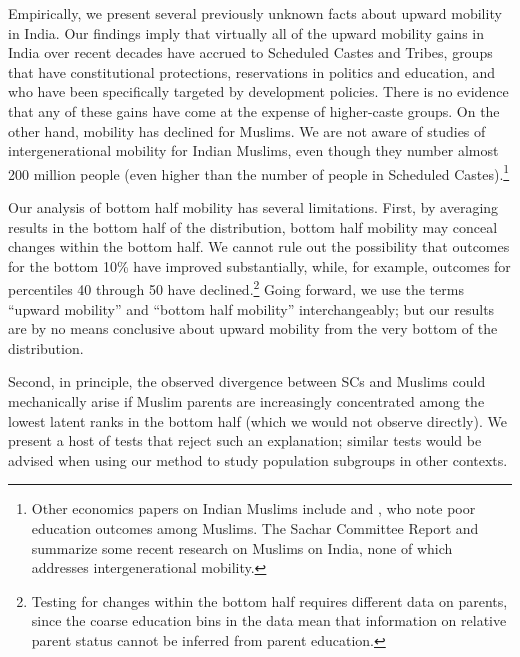 \documentclass[12pt,letterpaper]{article}
\numberwithin{equation}{section}
\begin{document}
Empirically, we present several previously unknown facts about upward mobility
in India. Our findings imply that virtually all of the upward mobility gains in India over recent decades have accrued to Scheduled Castes and Tribes, groups that have constitutional protections, reservations in politics and education, and who have been specifically targeted by development policies. There is no evidence that any of these gains have come at the expense of higher-caste groups. On the other hand, mobility has declined for Muslims. We are not aware of studies of intergenerational mobility for Indian Muslims, even though they number almost 200 million people (even higher than the number of people in Scheduled Castes).\footnote{Other economics papers on Indian Muslims include  and , who note poor education outcomes among Muslims. The Sachar Committee Report \citeyear{sachar2006} and  summarize some recent research on Muslims on India, none of which addresses intergenerational mobility.}

Our analysis of bottom half mobility has several limitations. First, by averaging results in the bottom half of the distribution, bottom half mobility may conceal changes within the bottom half. We cannot rule out the possibility that outcomes for the bottom 10\% have improved substantially, while, for example, outcomes for percentiles 40 through 50 have declined.\footnote{Testing for changes within the bottom half requires different data on parents, since the coarse education bins in the data mean that information on relative parent status cannot be inferred from parent education.} Going forward, we use the terms ``upward mobility'' and ``bottom half mobility'' interchangeably; but our results are by no means conclusive about upward mobility from the very bottom of the distribution.

Second, in principle, the observed divergence between SCs and Muslims could mechanically arise if Muslim parents are increasingly concentrated among the lowest latent ranks in the bottom half (which we would not observe directly). We present a host of tests that reject such an explanation; similar tests would be advised when using our method to study population subgroups in other contexts.
\end{document}
